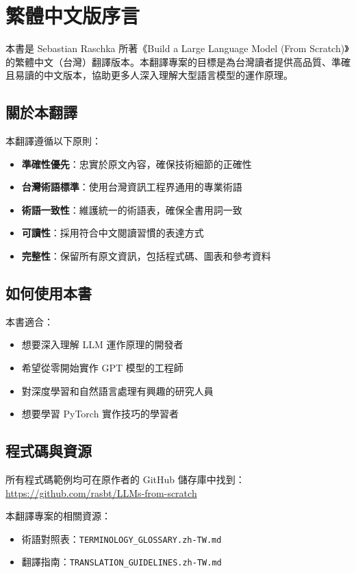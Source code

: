 \documentclass[12pt,a4paper,openany]{book}
\begin{document}
\chapter*{繁體中文版序言}

本書是 Sebastian Raschka 所著《Build a Large Language Model (From Scratch)》的繁體中文（台灣）翻譯版本。本翻譯專案的目標是為台灣讀者提供高品質、準確且易讀的中文版本，協助更多人深入理解大型語言模型的運作原理。

\section*{關於本翻譯}

本翻譯遵循以下原則：

\begin{itemize}
    \item \textbf{準確性優先}：忠實於原文內容，確保技術細節的正確性
    \item \textbf{台灣術語標準}：使用台灣資訊工程界通用的專業術語
    \item \textbf{術語一致性}：維護統一的術語表，確保全書用詞一致
    \item \textbf{可讀性}：採用符合中文閱讀習慣的表達方式
    \item \textbf{完整性}：保留所有原文資訊，包括程式碼、圖表和參考資料
\end{itemize}

\section*{如何使用本書}

本書適合：
\begin{itemize}
    \item 想要深入理解 LLM 運作原理的開發者
    \item 希望從零開始實作 GPT 模型的工程師
    \item 對深度學習和自然語言處理有興趣的研究人員
    \item 想要學習 PyTorch 實作技巧的學習者
\end{itemize}

\section*{程式碼與資源}

所有程式碼範例均可在原作者的 GitHub 儲存庫中找到：
\url{https://github.com/rasbt/LLMs-from-scratch}

本翻譯專案的相關資源：
\begin{itemize}
    \item 術語對照表：\texttt{TERMINOLOGY\_GLOSSARY.zh-TW.md}
    \item 翻譯指南：\texttt{TRANSLATION\_GUIDELINES.zh-TW.md}
\end{itemize}
\end{document}
